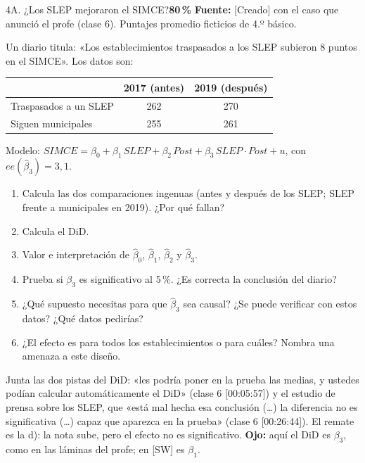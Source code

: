 \documentclass[11pt]{article}
\newcommand{\prob}[1]{\colorbox{red!15}{\textbf{#1}}}
\newcommand{\fuente}[1]{{\small\textcolor{blue!50!black}{\textbf{Fuente:} #1}}\par}
\begin{document}
\begin{ej}{4A. ¿Los SLEP mejoraron el SIMCE?}{\prob{80\,\%}}
\fuente{[Creado] con el caso que anunció el profe (clase 6). Puntajes promedio ficticios de 4.º básico.}
Un diario titula: «Los establecimientos traspasados a los SLEP subieron 8 puntos en el SIMCE». Los datos son:
\begin{center}\small
\begin{tabular}{lcc}\toprule
 & 2017 (antes) & 2019 (después)\\\midrule
Traspasados a un SLEP & 262 & 270\\
Siguen municipales & 255 & 261\\\bottomrule
\end{tabular}
\end{center}
Modelo: $SIMCE=\beta_0+\beta_1\,SLEP+\beta_2\,Post+\beta_3\,SLEP\cdot Post+u$, con $ee(\hat\beta_3)=3{,}1$.
\begin{enumerate}[label=\alph*),itemsep=0pt,topsep=2pt]
\item Calcula las dos comparaciones ingenuas (antes y después de los SLEP; SLEP frente a municipales en 2019). ¿Por qué fallan?
\item Calcula el DiD.
\item Valor e interpretación de $\hat\beta_0$, $\hat\beta_1$, $\hat\beta_2$ y $\hat\beta_3$.
\item Prueba si $\beta_3$ es significativo al 5\,\%. ¿Es correcta la conclusión del diario?
\item ¿Qué supuesto necesitas para que $\hat\beta_3$ sea causal? ¿Se puede verificar con estos datos? ¿Qué datos pedirías?
\item ¿El efecto es para todos los establecimientos o para cuáles? Nombra una amenaza a este diseño.
\end{enumerate}
\end{ej}
\begin{porque}
Junta las dos pistas del DiD: «les podría poner en la prueba las medias, y ustedes podían calcular automáticamente el DiD» (clase 6 [00:05:57]) y el estudio de prensa sobre los SLEP, que «está mal hecha esa conclusión (\dots) la diferencia no es significativa (\dots) capaz que aparezca en la prueba» (clase 6 [00:26:44]). El remate es la d): la nota sube, pero el efecto no es significativo. \textbf{Ojo:} aquí el DiD es $\beta_3$, como en las láminas del profe; en [SW] es $\beta_1$.
\end{porque}
\end{document}
